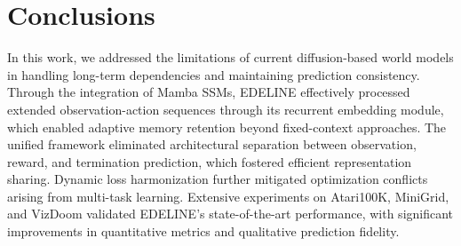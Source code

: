 \section{Conclusions}

In this work, we addressed the limitations of current diffusion-based world models in handling long-term dependencies and maintaining prediction consistency. Through the integration of Mamba SSMs, EDELINE effectively processed extended observation-action sequences through its recurrent embedding module, which enabled adaptive memory retention beyond fixed-context approaches. The unified framework eliminated architectural separation between observation, reward, and termination prediction, which fostered efficient representation sharing. Dynamic loss harmonization further mitigated optimization conflicts arising from multi-task learning. Extensive experiments on Atari100K, MiniGrid, and VizDoom validated EDELINE's state-of-the-art performance, with significant improvements in quantitative metrics and qualitative prediction fidelity.